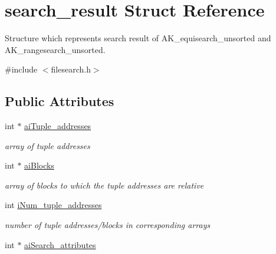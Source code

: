 \hypertarget{structsearch__result}{\section{search\+\_\+result Struct Reference}
\label{structsearch__result}
}


Structure which represents search result of A\+K\+\_\+equisearch\+\_\+unsorted and A\+K\+\_\+rangesearch\+\_\+unsorted.  




{\ttfamily \#include $<$filesearch.\+h$>$}

\subsection*{Public Attributes}
\begin{DoxyCompactItemize}
\item 
\hypertarget{structsearch__result_af2cb5dfee775be70399ba31416737727}{int $\ast$ \hyperlink{structsearch__result_af2cb5dfee775be70399ba31416737727}{ai\+Tuple\+\_\+addresses}}\label{structsearch__result_af2cb5dfee775be70399ba31416737727}

\begin{DoxyCompactList}\small\item\em array of tuple addresses \end{DoxyCompactList}\item 
\hypertarget{structsearch__result_a4ba8a4ba679981a3e3273e3089a01a8f}{int $\ast$ \hyperlink{structsearch__result_a4ba8a4ba679981a3e3273e3089a01a8f}{ai\+Blocks}}\label{structsearch__result_a4ba8a4ba679981a3e3273e3089a01a8f}

\begin{DoxyCompactList}\small\item\em array of blocks to which the tuple addresses are relative \end{DoxyCompactList}\item 
\hypertarget{structsearch__result_a983f29e754aa7f890ee2b688b1d7a9b9}{int \hyperlink{structsearch__result_a983f29e754aa7f890ee2b688b1d7a9b9}{i\+Num\+\_\+tuple\+\_\+addresses}}\label{structsearch__result_a983f29e754aa7f890ee2b688b1d7a9b9}

\begin{DoxyCompactList}\small\item\em number of tuple addresses/blocks in corresponding arrays \end{DoxyCompactList}\item 
\hypertarget{structsearch__result_a7017e2fb19d50df97aad9224f8cba682}{int $\ast$ \hyperlink{structsearch__result_a7017e2fb19d50df97aad9224f8cba682}{ai\+Search\+\_\+attributes}}\label{structsearch__result_a7017e2fb19d50df97aad9224f8cba682}


\end{DoxyCompactItemize}
